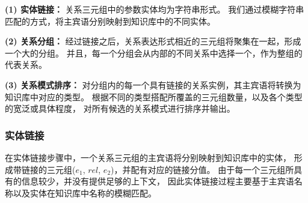 \textbf{(1) 实体链接：}
关系三元组中的参数实体均为字符串形式。
我们通过模糊字符串匹配的方式，将主宾语分别映射到知识库中的不同实体。

\textbf{(2) 关系分组：}
经过链接之后，关系表达形式相近的三元组将聚集在一起，形成一个大的分组。
并且，每一个分组会从内部的不同关系中选择一个，作为整组的代表关系。

\textbf{(3) 关系模式排序：}
对分组内的每一个具有链接的关系实例，其主宾语将转换为知识库中对应的类型。
根据不同的类型搭配所覆盖的三元组数量，以及各个类型的宽泛或具体程度，
对所有候选的关系模式进行排序并输出。



\subsubsection{实体链接}
\label{sec:tinf-linking}

在实体链接步骤中，一个关系三元组的主宾语将分别映射到知识库中的实体，
形成带链接的三元组($e_1$, $rel$, $e_2$)，并配有对应的链接分值。
由于每一个三元组所具有的信息较少，并没有提供足够的上下文，
因此实体链接过程主要基于主宾语名称以及实体在知识库中名称的模糊匹配。

